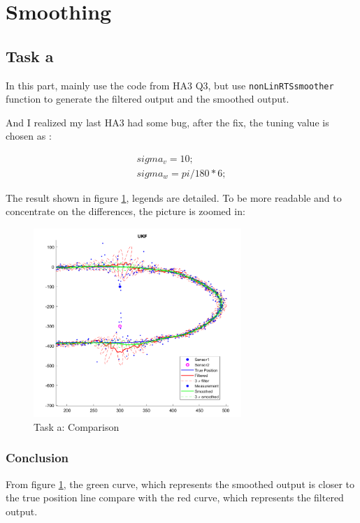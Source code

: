 \section{Smoothing}
\subsection{Task a}

In this part, mainly use the code from HA3 Q3, but use \texttt{nonLinRTSsmoother} function to generate the filtered output and the smoothed output.

And I realized my last HA3 had some bug, after the fix, the tuning value is chosen as :

\begin{equation}
    \begin{aligned}
        sigma_v = 10;\\
sigma_w = pi/180*6;\nonumber
    \end{aligned}
\end{equation}

The result shown in figure \ref{taska}, legends are detailed. To be more readable and to concentrate on the differences, the picture is zoomed in:

\begin{figure}[H]
 \centering
 \includegraphics[width=0.7\textwidth]{images/taska.png}
 \caption{Task a: Comparison}
 \label{taska}
\end{figure}

\subsubsection{Conclusion}

From figure \ref{taska}, the green curve, which represents the smoothed output is closer to the true position line compare with the red curve, which represents the filtered output.

